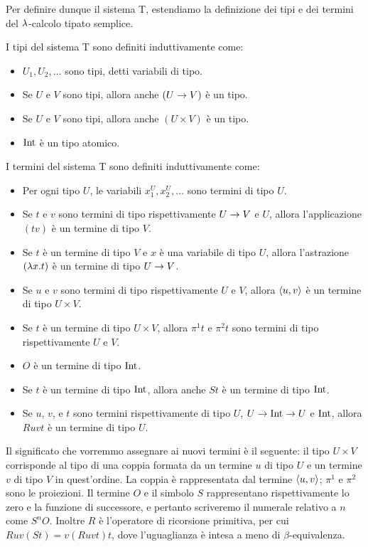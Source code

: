 \documentclass[]{marticle}
\begin{document}
Per definire dunque il sistema T, estendiamo la definizione dei tipi e dei
termini del $\lambda$-calcolo tipato semplice. 
\begin{block}[Definizione]
    I tipi del sistema T sono definiti induttivamente come:
    \begin{itemize}
        \item $U_1, U_2, \dots$ sono tipi, detti variabili di tipo.
        \item Se $U$ e $V$ sono tipi, allora anche $(U\rightarrow V)$ \`e un tipo.
        \item Se $U$ e $V$ sono tipi, allora anche $(U\times V)$ \`e un tipo.
        \item $\text{Int}$ \`e un tipo atomico.
    \end{itemize}

    I termini del sistema T sono definiti induttivamente come:
    \begin{itemize}
        \item Per ogni tipo $U$, le variabili $x^U_1, x^U_2, \dots$ sono termini
            di tipo $U$.
        \item Se $t$ e $v$ sono termini di tipo rispettivamente $U\rightarrow V$ e $U$,
            allora l'applicazione $(tv)$ \`e un termine di tipo $V$.
        \item Se $t$ \`e un termine di tipo $V$ e $x$ \`e una variabile di tipo
            $U$, allora l'astrazione $(\lambda x.  t)$ \`e un termine di tipo $U\rightarrow
            V$.
        \item Se $u$ e $v$ sono termini di tipo rispettivamente $U$ e $V$,
            allora $\langle u,v \rangle$ \`e un termine di tipo $U\times V$.
        \item Se $t$ \`e un termine di tipo $U\times V$, allora $\pi^1 t$ e
            $\pi^2t$ sono termini di tipo rispettivamente $U$ e $V$.
        \item $O$ \`e un termine di tipo $\text{Int}$.
        \item Se $t$ \`e un termine di tipo $\text{Int}$, allora anche $St$ \`e un
            termine di tipo $\text{Int}$.
        \item Se $u$, $v$, e $t$ sono termini rispettivamente di tipo $U$,
            $U\rightarrow \text{Int}\rightarrow U$ e $\text{Int}$, allora $Ruvt$ \`e un termine di
            tipo $U$.
    \end{itemize}
\end{block}

Il significato che vorremmo assegnare ai nuovi termini \`e il seguente: il tipo
$U\times V$ corrisponde al tipo di una coppia formata da un termine $u$ di tipo
$U$ e un termine $v$ di tipo $V$ in quest'ordine. La coppia \`e rappresentata
dal termine $\langle u,v \rangle$; $\pi^1$ e $\pi^2$ sono le proiezioni.  Il termine $O$ e
il simbolo $S$ rappresentano rispettivamente lo zero e la funzione di
successore, e pertanto scriveremo il numerale relativo a $n$ come $S^nO$.
Inoltre $R$ \`e l'operatore di ricorsione primitiva, per cui $Ruv(St) =
v(Ruvt)t$, dove l'uguaglianza \`e intesa a meno di $\beta$-equivalenza.
\end{document}
